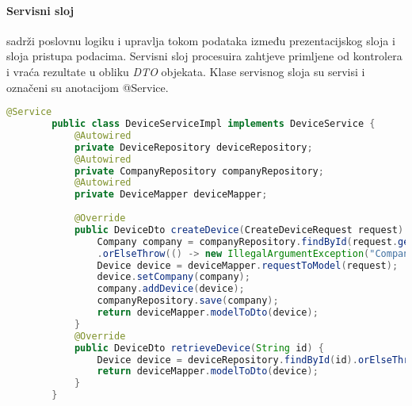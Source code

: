 \documentclass[zavrsnirad]{fer}
\begin{document}
	\paragraph{Servisni sloj} sadrži poslovnu logiku i upravlja tokom podataka između prezentacijskog sloja i sloja pristupa podacima. Servisni sloj procesuira zahtjeve primljene od kontrolera i vraća rezultate u obliku \textit{DTO} objekata. Klase servisnog sloja su servisi i označeni su anotacijom @Service. 
	\begin{lstlisting}[language=Java, caption=Device Service]
		@Service
		public class DeviceServiceImpl implements DeviceService {
			@Autowired
			private DeviceRepository deviceRepository;
			@Autowired
			private CompanyRepository companyRepository;
			@Autowired
			private DeviceMapper deviceMapper;
			
			@Override
			public DeviceDto createDevice(CreateDeviceRequest request) {
				Company company = companyRepository.findById(request.getCompanyId())
				.orElseThrow(() -> new IllegalArgumentException("Company with id: '" + request.getCompanyId() + "' does not exist!"));
				Device device = deviceMapper.requestToModel(request);
				device.setCompany(company);
				company.addDevice(device);
				companyRepository.save(company);
				return deviceMapper.modelToDto(device);
			}
			@Override
			public DeviceDto retrieveDevice(String id) {
				Device device = deviceRepository.findById(id).orElseThrow(() -> new DeviceNotFoundException(id));
				return deviceMapper.modelToDto(device);
			}
		}
	\end{lstlisting}
	
\end{document}
